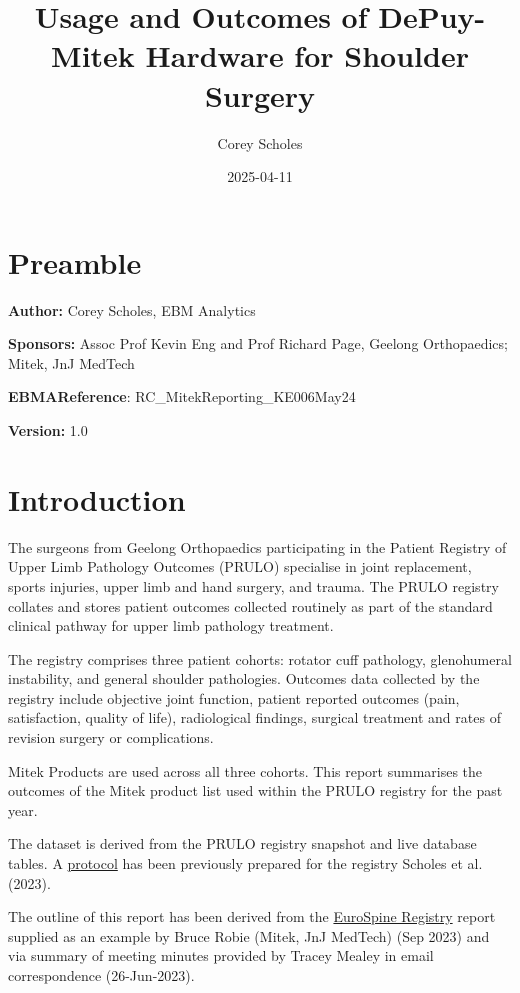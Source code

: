 \documentclass[
]{article}
\title{Usage and Outcomes of DePuy-Mitek Hardware for Shoulder Surgery}
\author{Corey Scholes}
\date{2025-04-11}
\renewcommand*\contentsname{Table of contents}
\newcommand\contentsname{Table of contents}
\begin{document}
\maketitle

\renewcommand*\contentsname{Table of contents}
{
\hypersetup{linkcolor=}
\setcounter{tocdepth}{3}
\tableofcontents
}
\section{Preamble}\label{preamble}

\textbf{Author:} Corey Scholes, EBM Analytics

\textbf{Sponsors:} Assoc Prof Kevin Eng and Prof Richard Page, Geelong
Orthopaedics; Mitek, JnJ MedTech

\textbf{EBMAReference}: RC\_MitekReporting\_KE006May24

\textbf{Version:} 1.0

\section{Introduction}\label{introduction}

The surgeons from Geelong Orthopaedics participating in the Patient
Registry of Upper Limb Pathology Outcomes (PRULO) specialise in joint
replacement, sports injuries, upper limb and hand surgery, and trauma.
The PRULO registry collates and stores patient outcomes collected
routinely as part of the standard clinical pathway for upper limb
pathology treatment.

The registry comprises three patient cohorts: rotator cuff pathology,
glenohumeral instability, and general shoulder pathologies. Outcomes
data collected by the registry include objective joint function, patient
reported outcomes (pain, satisfaction, quality of life), radiological
findings, surgical treatment and rates of revision surgery or
complications.

Mitek Products are used across all three cohorts. This report summarises
the outcomes of the Mitek product list used within the PRULO registry
for the past year.

The dataset is derived from the PRULO registry snapshot and live
database tables. A
\href{https://academic.oup.com/jsprm/article/2023/4/snad014/7317733}{protocol}
has been previously prepared for the registry Scholes et al. (2023).

The outline of this report has been derived from the
\href{https://drive.google.com/file/d/1ahcwmg50p87BR0AgJQXb740z2g7LUj-J/view?usp=sharing}{EuroSpine
Registry} report supplied as an example by Bruce Robie (Mitek, JnJ
MedTech) (Sep 2023) and via summary of meeting minutes provided by
Tracey Mealey in email correspondence (26-Jun-2023).
\end{document}

